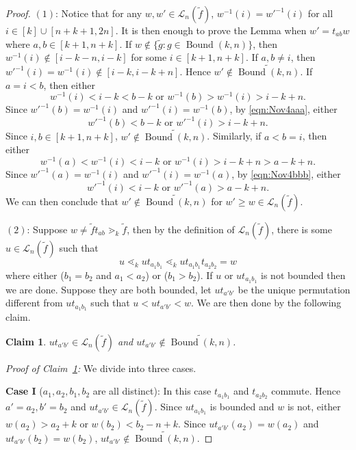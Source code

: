 \documentclass[12pt,reqno]{amsart}
\newtheorem{claim}[lemma]{Claim}
\theoremstyle{definition}
\newcommand{\bound}{\operatorname{Bound}}
\newcommand{\Lenart}{\mathcal{L}}
\begin{document}
{\begin{proof}
    \noindent $(1)$:
    Notice that for any $w,w'\in \mathcal{L}_n(\widetilde{f})$, $w^{-1}(i) = w'^{-1}(i)$ for all $i\in [k]\cup [n{+}k{+}1,2n]$. 
    It is then enough to prove the Lemma when $w' = t_{ab}w$ where $a,b\in [k+1,n+k]$.
    If $w\notin \{\widetilde{g}:g\in \bound(k,n)\}$, then 
    $w^{-1}(i)\notin [i-k-n,i-k]$
    for some $i\in [k+1,n+k]$. If $a,b\neq i$, then $w'^{-1}(i) = w^{-1}(i)\notin [i-k,i-k+n]$. Hence $w'\notin \widetilde{\bound(k,n)}$. If $a=i<b$, then either
    \begin{equation}\label{eqn:Nov4aaa}
        w^{-1}(i)<i-k<b-k\text{ or } w^{-1}(b)>w^{-1}(i)>i-k+n.
    \end{equation}
    Since $w'^{-1}(b) = w^{-1}(i)$ and $w'^{-1}(i) = w^{-1}(b)$, by \eqref{eqn:Nov4aaa}, either 
    \[w'^{-1}(b)<b-k\text{ or }w'^{-1}(i)>i-k+n.\]
    Since $i,b\in [k+1,n+k]$, $w'\notin \widetilde{\bound(k,n)}$.
    Similarly, if $a<b=i$, then either 
    \begin{equation}\label{eqn:Nov4bbb}
        w^{-1}(a)<w^{-1}(i)<i-k \text{ or }w^{-1}(i)>i-k+n>a-k+n.
    \end{equation}
    Since $w'^{-1}(a) = w^{-1}(i)$ and $w'^{-1}(i) = w^{-1}(a)$, by \eqref{eqn:Nov4bbb}, either
    \[w'^{-1}(i)<i-k\text{ or }w'^{-1}(a)>a-k+n.\]
    We can then conclude that $w'\notin \widetilde{\bound(k,n)}$ for $w'\geq w \in \mathcal{L}_n(\widetilde{f})$. 
    
    \medskip

    \noindent $(2)$: Suppose $w\neq \widetilde{f}t_{ab}\gtrdot_k \widetilde{f}$, then by the definition of $\Lenart_n(\widetilde{f})$, there is some $u\in \Lenart_n(\widetilde{f})$ such that 
    \begin{equation}
        u\lessdot_k ut_{a_1b_1} \lessdot_k ut_{a_1b_1}t_{a_2b_2} = w
    \end{equation}
    where either ($b_1 = b_2$ and $a_1<a_2$)  or ($b_1>b_2$). If $u$ or $ut_{a_1b_1}$ is not bounded then we are done. Suppose they are both bounded, let $ut_{a'b'}$ be the unique permutation different from $ut_{a_1b_1}$ such that $u<ut_{a'b'}<w$. We are then done by the following claim.
    \begin{claim}\label{claim:Nov5aaa}
        $ut_{a'b'}\in \Lenart_n(\widetilde{f})$ and $ut_{a'b'}\notin \widetilde{\bound(k,n)}$. 
    \end{claim}
\noindent \emph{Proof of Claim~\ref{claim:Nov5aaa}:}
        We divide into three cases.
        \medskip
        
        \noindent \textbf{Case I} ($a_1,a_2,b_1,b_2$ are all distinct): In this case $t_{a_1b_1}$ and $t_{a_2b_2}$ commute. Hence
        $a' = a_2,b' = b_2$ and $ut_{a'b'}\in \Lenart_n(\widetilde{f})$. Since $ut_{a_1b_1}$ is bounded and $w$ is not, either $w(a_2)>a_2+k$ or $w(b_2)<b_2-n+k$. Since $ut_{a'b'}(a_2) = w(a_2)$ and $ut_{a'b'}(b_2) = w(b_2)$, $ut_{a'b'}\notin \widetilde{\bound(k,n)}$.


\end{proof}}
\end{document}
